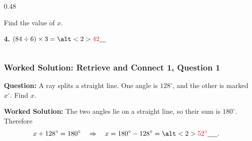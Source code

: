 \documentclass[aspectratio=169]{beamer}
\newcommand{\ablank}[1]{%
  \alt<2>{\textcolor{red}{#1}}{\underline{\phantom{#1}}}%
}
\newcommand{\ashow}[1]{\uncover<2->{\textcolor{red}{\small #1}}}
\begin{document}
\begin{frame}
\begin{columns}[t,onlytextwidth]
\begin{column}{0.48\textwidth}

      \vspace{0.7em}
      Find the value of $x$.
      \ashow{\quad $x = 62^\circ$}

      \vfill
        \vspace{1em}
      \textbf{4.} \quad $(84 \div 6) \times 3 = \ablank{42}$
    \end{column}
  \end{columns}

\end{frame}

\begin{frame}
  \frametitle{Worked Solution: Retrieve and Connect 1, Question 1}
  \hypertarget{work-st1}{}

  \textbf{Question:} A ray splits a straight line. One angle is \(128^\circ\), and the other is marked \(x^\circ\). Find \(x\).

  \begin{center}
  \end{center}

  \textbf{Worked Solution:} The two angles lie on a straight line, so their sum is \(180^\circ\). Therefore
  \[
  x + 128^\circ = 180^\circ
  \quad\Rightarrow\quad
  x = 180^\circ - 128^\circ = \ablank{52^\circ}.
  \]
\end{frame}
\end{document}
